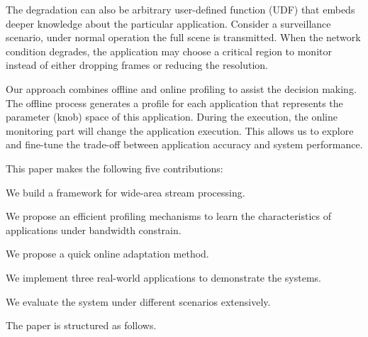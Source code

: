The degradation can also be arbitrary user-defined function (UDF) that embeds
deeper knowledge about the particular application. Consider a surveillance
scenario, under normal operation the full scene is transmitted. When the network
condition degrades, the application may choose a critical region to monitor
instead of either dropping frames or reducing the resolution.


Our approach combines offline and online profiling to assist the decision
making. The offline process generates a profile for each application that
represents the parameter (knob) space of this application. During the execution,
the online monitoring part will change the application execution. This allows us
to explore and fine-tune the trade-off between application accuracy and system
performance.


This paper makes the following five contributions:

\squishlist    %
\item We build a framework for wide-area stream processing.
\item We propose an efficient profiling mechanisms to learn the characteristics
  of applications under bandwidth constrain.
\item We propose a quick online adaptation method.
\item We implement three real-world applications to demonstrate the systems.
\item We evaluate the system under different scenarios extensively.
  \squishend %

The paper is structured as follows.

